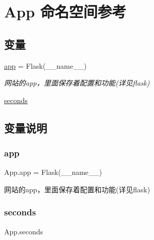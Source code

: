 \hypertarget{namespace_app}{}\section{App 命名空间参考}
\label{namespace_app}
\subsection*{变量}
\begin{DoxyCompactItemize}
\item 
\mbox{\hyperlink{namespace_app_abd43e5462f18721d8be4fa38d8bc33ff}{app}} = Flask(\+\_\+\+\_\+name\+\_\+\+\_\+)
\begin{DoxyCompactList}\small\item\em 网站的app，里面保存着配置和功能(详见flask) \end{DoxyCompactList}\item 
\mbox{\hyperlink{namespace_app_a8add93cb54ed04b7b3cf7ec8b005b1b4}{seconds}}
\end{DoxyCompactItemize}


\subsection{变量说明}
\mbox{\label{namespace_app_abd43e5462f18721d8be4fa38d8bc33ff}} 
\subsubsection{\texorpdfstring{app}{app}}
{\footnotesize\ttfamily App.\+app = Flask(\+\_\+\+\_\+name\+\_\+\+\_\+)}



网站的app，里面保存着配置和功能(详见flask) 

\mbox{\label{namespace_app_a8add93cb54ed04b7b3cf7ec8b005b1b4}} 
\subsubsection{\texorpdfstring{seconds}{seconds}}
{\footnotesize\ttfamily App.\+seconds}


